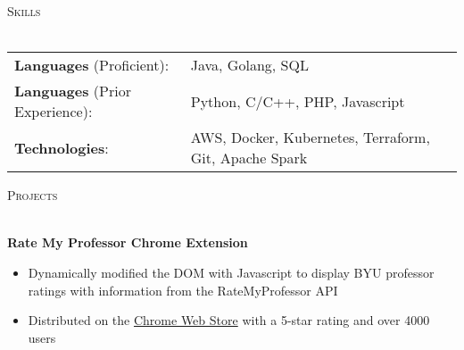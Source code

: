 \documentclass[letterpaper]{article}
\newcommand{\lineunder} {
    \vspace*{-8pt} \\
    \hspace*{-18pt} \hrulefill \\
}
\newcommand{\header} [1] {
    {\hspace*{-18pt}\vspace*{6pt} \textsc{#1}}
    \vspace*{-6pt} \lineunder
    \vspace{1mm}
}
\begin{document}
\header{Skills}

\begin{tabular}{ l l}
    \vspace{2mm}
    \textbf{Languages} (Proficient):       & Java, Golang, SQL                                     \\
    \vspace{2mm}
    \textbf{Languages} (Prior Experience): & Python, C/C++, PHP, Javascript                        \\
    \textbf{Technologies}:                 & AWS, Docker, Kubernetes, Terraform, Git, Apache Spark \\
\end{tabular}
\vspace{2mm}

\header{Projects}

\textbf{Rate My Professor Chrome Extension} \\
\vspace{-1mm}
\begin{itemize} \itemsep 1pt
    \item Dynamically modified the DOM with Javascript to display BYU professor ratings with information from the RateMyProfessor API
    \item Distributed on the \href{https://chrome.google.com/webstore/detail/rate-my-byu-professors/ghokpcnkghnkfofadiajmmhinooijmaf}{Chrome Web Store} with a 5-star rating and over 4000 users
\end{itemize}
\vspace*{2mm}

\
\end{document}

